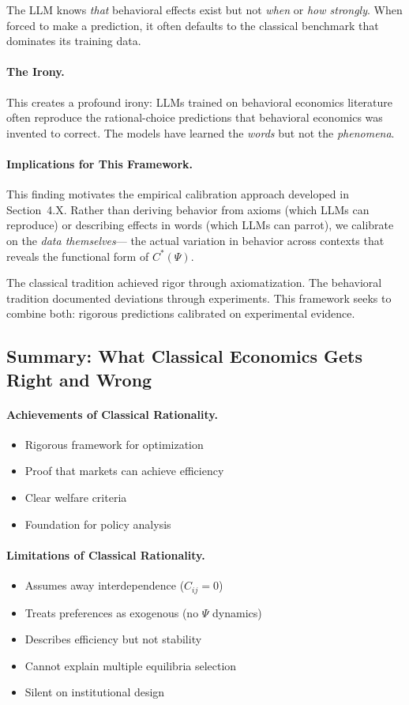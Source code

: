 The LLM knows \emph{that} behavioral effects exist but not \emph{when} or \emph{how strongly}.
When forced to make a prediction, it often defaults to the classical benchmark
that dominates its training data.

\paragraph{The Irony.}
This creates a profound irony: LLMs trained on behavioral economics literature
often reproduce the rational-choice predictions that behavioral economics was
invented to correct. The models have learned the \emph{words} but not the
\emph{phenomena}.

\paragraph{Implications for This Framework.}
This finding motivates the empirical calibration approach developed in Section~4.X.
Rather than deriving behavior from axioms (which LLMs can reproduce) or describing
effects in words (which LLMs can parrot), we calibrate on the \emph{data themselves}---
the actual variation in behavior across contexts that reveals the functional form
of $C^*(\Psi)$.

The classical tradition achieved rigor through axiomatization.
The behavioral tradition documented deviations through experiments.
This framework seeks to combine both: rigorous predictions calibrated on experimental evidence.

\subsection{Summary: What Classical Economics Gets Right and Wrong}

\paragraph{Achievements of Classical Rationality.}
\begin{itemize}
  \item Rigorous framework for optimization
  \item Proof that markets can achieve efficiency
  \item Clear welfare criteria
  \item Foundation for policy analysis
\end{itemize}

\paragraph{Limitations of Classical Rationality.}
\begin{itemize}
  \item Assumes away interdependence ($C_{ij} = 0$)
  \item Treats preferences as exogenous (no $\Psi$ dynamics)
  \item Describes efficiency but not stability
  \item Cannot explain multiple equilibria selection
  \item Silent on institutional design
\end{itemize}

